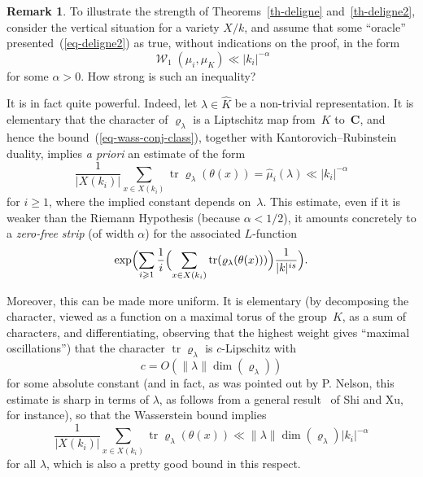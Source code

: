 \documentclass[12pt]{amsart}
\renewcommand{\mathcal}{\mathscr}
\renewcommand{\geq}{\geqslant}
\newcommand{\Cc}{\mathbf{C}}
\DeclareMathOperator{\wass}{\mathcal{W}}
\DeclareMathOperator{\Tr}{tr}
\renewcommand{\rho}{\varrho}
\theoremstyle{plain}
\newtheorem{theorem}{Theorem}[section]
\theoremstyle{remark}
\theoremstyle{definition}
\newtheorem{remark}[theorem]{Remark}
\renewcommand{\geq}{\geqslant}
\begin{document}
\begin{remark}
  To illustrate the strength of Theorems~\ref{th-deligne}
  and~\ref{th-deligne2}, consider the vertical situation for a variety
  $X/k$, and assume that some ``oracle'' presented~(\ref{eq-deligne2})
  as true, without indications on the proof, in the form
  \[
    \wass_1(\mu_i,\mu_K)\ll |k_i|^{-\alpha}
  \]
  for some $\alpha>0$. How strong is such an inequality?

  It is in fact quite powerful. Indeed, let $\lambda\in \widehat{K}$ be
  a non-trivial representation. It is elementary that the character of
  $\rho_{\lambda}$ is a Liptschitz map from~$K$ to~$\Cc$, and hence the
  bound~(\ref{eq-wass-conj-class}), together with
  Kantorovich--Rubinstein duality, implies \emph{a priori} an estimate
  of the form
  \[
    \frac{1}{|X(k_i)|}\sum_{x\in X(k_i)} \Tr\rho_{\lambda}(\theta(x))=
    \widehat{\mu}_i(\lambda)\ll |k_i|^{-\alpha}
  \]
  for $i\geq 1$, where the implied constant depends on~$\lambda$. This
  estimate, even if it is weaker than the Riemann Hypothesis (because
  $\alpha<1/2$), it amounts concretely to a \emph{zero-free strip} (of
  width $\alpha$) for the associated $L$-function
  \[
    \exp\Bigl(\sum_{i\geq 1}\frac{1}{i}\Bigl(\sum_{x\in X(k_i)}
    \Tr(\rho_{\lambda}(\theta(x)))\Bigr)\frac{1}{|k|^{is}}\Bigr).
  \]

  Moreover, this can be made more uniform. It is elementary (by
  decomposing the character, viewed as a function on a maximal torus of
  the group~$K$, as a sum of characters, and differentiating, observing
  that the highest weight gives ``maximal oscillations'') that the
  character $\Tr\rho_{\lambda}$ is $c$-Lipschitz with
  \[
    c=O(\|\lambda\|\dim(\rho_{\lambda}))
  \]
  for some absolute constant (and in fact, as was pointed out by
  P. Nelson, this estimate is sharp in terms of $\lambda$, as follows
  from a general result~\cite[Th.\,1]{shi-xu} of Shi and Xu, for
  instance), so that the Wasserstein bound implies
  \[
    \frac{1}{|X(k_i)|}\sum_{x\in X(k_i)} \Tr\rho_{\lambda}(\theta(x))
    \ll \|\lambda\|\dim(\rho_{\lambda})|k_i|^{-\alpha}
  \]
  for all $\lambda$, which is also a pretty good bound in this respect.
\end{remark}



\end{document}
